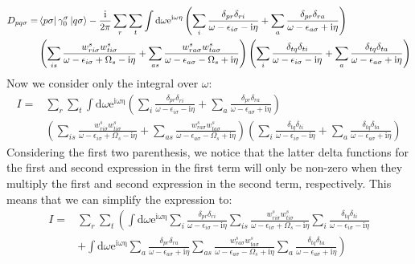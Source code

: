 \documentclass[12pt]{article}
\begin{document}
\begin{equation}
\begin{aligned}
D_{p q \sigma}= & \bra{p\sigma } \gamma _0^\sigma \ket{q\sigma } -\frac{\mathrm{i }}{2 \pi} \sum_{r} \sum_{t} \int \mathrm{d} \omega \mathrm{e}^{\mathrm{i \omega \eta}} \left( \sum_i \frac{\delta_{p r} \delta_{r i}}{\omega-\epsilon_{i \sigma}-\mathrm{i} \eta}+\sum_a \frac{\delta_{p r} \delta_{r a}}{\omega-\epsilon_{a \sigma}+\mathrm{i} \eta} \right)\\
& \left( \sum_{i s} \frac{w_{r i \sigma}^s w_{t i \sigma}^s}{\omega-\epsilon_{i \sigma}+\Omega_s-\mathrm{i} \eta} +\sum_{a s} \frac{w_{r a \sigma}^s w_{t a \sigma}^s}{\omega-\epsilon_{a \sigma}-\Omega_s+\mathrm{i} \eta} \right) \left( \sum_i \frac{\delta_{t q} \delta_{t i}}{\omega-\epsilon_{i \sigma}-\mathrm{i} \eta}+\sum_a \frac{\delta_{t q} \delta_{t a}}{\omega-\epsilon_{a \sigma}+\mathrm{i} \eta} \right)
\end{aligned}
\end{equation}
Now we consider only the integral over $\omega$:
\begin{equation}
\begin{aligned}
I = & \sum_{r} \sum_{t} \int \mathrm{d} \omega \mathrm{e}^{\mathrm{i \omega \eta}} \left( \sum_i \frac{\delta_{p r} \delta_{r i}}{\omega-\epsilon_{i \sigma}-\mathrm{i} \eta}+\sum_a \frac{\delta_{p r} \delta_{r a}}{\omega-\epsilon_{a \sigma}+\mathrm{i} \eta} \right)\\
& \left( \sum_{i s} \frac{w_{r i \sigma}^s w_{t i \sigma}^s}{\omega-\epsilon_{i \sigma}+\Omega_s-\mathrm{i} \eta} +\sum_{a s} \frac{w_{r a \sigma}^s w_{t a \sigma}^s}{\omega-\epsilon_{a \sigma}-\Omega_s+\mathrm{i} \eta} \right) \left( \sum_i \frac{\delta_{t q} \delta_{t i}}{\omega-\epsilon_{i \sigma}-\mathrm{i} \eta}+\sum_a \frac{\delta_{t q} \delta_{t a}}{\omega-\epsilon_{a \sigma}+\mathrm{i} \eta} \right)
\end{aligned}
\end{equation}
Considering the first two parenthesis, we notice that the latter delta functions for the first and second expression in the first term will only be non-zero when they multiply the first and second expression in the second term, respectively. This means that we can simplify the expression to:
\begin{equation}
\begin{aligned}
I = & \sum_{r} \sum_{t} \left( \int \mathrm{d} \omega \mathrm{e}^{\mathrm{i \omega \eta}} \sum_i \frac{\delta_{p r} \delta_{r i}}{\omega-\epsilon_{i \sigma}-\mathrm{i} \eta} \sum_{i s} \frac{w_{r i \sigma}^s w_{t i \sigma}^s}{\omega-\epsilon_{i \sigma}+\Omega_s-\mathrm{i} \eta} \sum_i \frac{\delta_{t q} \delta_{t i}}{\omega-\epsilon_{i \sigma}-\mathrm{i} \eta} \right.\\
& \left. + \int \mathrm{d} \omega \mathrm{e}^{\mathrm{i \omega \eta}} \sum_a \frac{\delta_{p r} \delta_{r a}}{\omega-\epsilon_{a \sigma}+\mathrm{i} \eta} \sum_{a s} \frac{w_{r a \sigma}^s w_{t a \sigma}^s}{\omega-\epsilon_{a \sigma}-\Omega_s+\mathrm{i} \eta} \sum_a \frac{\delta_{t q} \delta_{t a}}{\omega-\epsilon_{a \sigma}+\mathrm{i} \eta} \right)
\end{aligned}
\end{equation}
\end{document}
